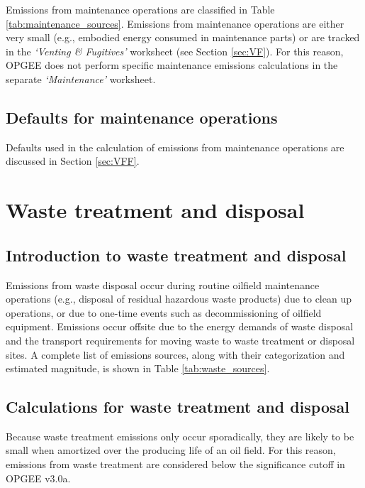 \documentclass[11pt]{report}
\newcommand{\version}{v3.0a}
\newcommand{\sheet}[1]{\textit{`{#1}'}}
\begin{document}
Emissions from maintenance operations are classified in Table \ref{tab:maintenance_sources}. Emissions from maintenance operations are either very small (e.g., embodied energy consumed in maintenance parts) or are tracked in the \sheet{Venting \& Fugitives} worksheet (see Section \ref{sec:VF}). For this reason, OPGEE does not perform specific maintenance emissions calculations in the separate \sheet{Maintenance} worksheet.

\subsection{Defaults for maintenance operations}

Defaults used in the calculation of emissions from maintenance operations are discussed in Section \ref{sec:VFF}.


\clearpage

\section{Waste treatment and disposal}
\label{sec:waste}

\subsection{Introduction to waste treatment and disposal}

Emissions from waste disposal occur during routine oilfield maintenance operations (e.g., disposal of residual hazardous waste products) due to clean up operations, or due to one-time events such as decommissioning of oilfield equipment. Emissions occur offsite due to the energy demands of waste disposal and the transport requirements for moving waste to waste treatment or disposal sites. A complete list of emissions sources, along with their categorization and estimated magnitude, is shown in Table \ref{tab:waste_sources}.


\subsection{Calculations for waste treatment and disposal}

Because waste treatment emissions only occur sporadically, they are likely to be small when amortized over the producing life of an oil field. For this reason, emissions from waste treatment are considered below the significance cutoff in OPGEE \version.
\end{document}
